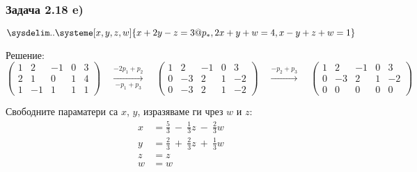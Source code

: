 \documentclass{subfiles}
\begin{document}
\subsubsection{Задача 2.18 e)}

\begin{equation*}
    \sysdelim..\systeme[x,y,z,w]{
        x + 2y - z = 3@p_{*},
        2x + y + w = 4,
        x - y + z + w = 1
    }
\end{equation*}

\noindent Решение:
\begin{equation*}
    \left(
        \begin{array}{ cccc|c }
            1 & 2  & -1 & 0 & 3 \\
            2 & 1  & 0 & 1 & 4 \\
            1 & -1 & 1 & 1 & 1
        \end{array}
    \right)
    \quad
    \overset{-2p_{1}+p_{2}}{\underset{-p_{1}+p_{3}}{\longrightarrow}}
    \quad
    \left(
        \begin{array}{ cccc|c }
            1 & 2  & -1 & 0 & 3 \\
            0 & -3 & 2 & 1 & -2 \\
            0 & -3 & 2 & 1 & -2
        \end{array}
    \right)
    \quad
    \overset{-p_{2}+p_{3}}{\longrightarrow}
    \quad
    \left(
        \begin{array}{ cccc|c }
            1 & 2  & -1 & 0 & 3 \\
            0 & -3 & 2 & 1 & -2 \\
            0 & 0 & 0 & 0  & 0
        \end{array}
    \right)
\end{equation*}

\noindent Свободните параматери са $x$, $y$, изразяваме ги чрез $w$ и $z$:
\begin{align*}
    x &= \frac{5}{3}\ −\ \frac{1}{3}z\ −\ \frac{2}{3}w \\
    y &= \frac{2}{3}\ +\ \frac{2}{3}z\ +\ \frac{1}{3}w \\
    z &= z \\
    w &= w
\end{align*}
\end{document}
